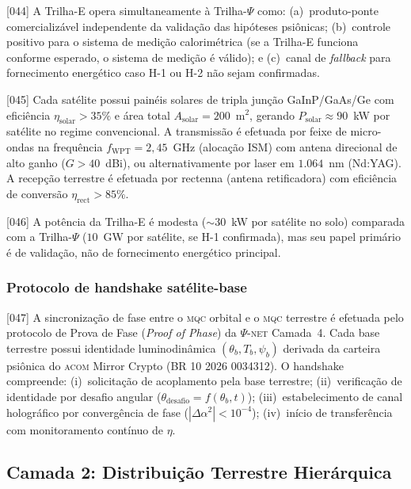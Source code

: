 \documentclass[12pt,a4paper]{article}
\newcommand{\alphaii}{\alpha^2}
\newcommand{\psion}{\psi}
\newcommand{\Psifield}{\Psi}
\newcommand{\ACOM}{\textsc{acom}}
\newcommand{\MQC}{\textsc{mqc}}
\newcommand{\PsiNET}{$\Psifield$-\textsc{net}}
\begin{document}
{[044]} A Trilha-E opera simultaneamente à Trilha-$\Psifield$ como: (a)~produto-ponte comercializável independente da validação das hipóteses psiônicas; (b)~controle positivo para o sistema de medição calorimétrica (se a Trilha-E funciona conforme esperado, o sistema de medição é válido); e (c)~canal de \textit{fallback} para fornecimento energético caso H-1 ou H-2 não sejam confirmadas.

{[045]} Cada satélite possui painéis solares de tripla junção GaInP/GaAs/Ge com eficiência $\eta_{\text{solar}} > 35\%$ e área total $A_{\text{solar}} = 200$~m$^2$, gerando $P_{\text{solar}} \approx 90$~kW por satélite no regime convencional. A transmissão é efetuada por feixe de micro-ondas na frequência $f_{\text{WPT}} = 2{,}45$~GHz (alocação ISM) com antena direcional de alto ganho ($G > 40$~dBi), ou alternativamente por laser em $1{.}064$~nm (Nd:YAG). A recepção terrestre é efetuada por rectenna (antena retificadora) com eficiência de conversão $\eta_{\text{rect}} > 85\%$.

{[046]} A potência da Trilha-E é modesta ($\sim 30$~kW por satélite no solo) comparada com a Trilha-$\Psifield$ ($10$~GW por satélite, se H-1 confirmada), mas seu papel primário é de validação, não de fornecimento energético principal.

\subsubsection{Protocolo de handshake satélite-base}

{[047]} A sincronização de fase entre o \MQC{} orbital e o \MQC{} terrestre é efetuada pelo protocolo de Prova de Fase (\textit{Proof of Phase}) da \PsiNET{} Camada~4. Cada base terrestre possui identidade luminodinâmica $(\theta_b, T_b, \psion_b)$ derivada da carteira psiônica do \ACOM{} Mirror Crypto (BR 10 2026 0034312). O handshake compreende: (i)~solicitação de acoplamento pela base terrestre; (ii)~verificação de identidade por desafio angular ($\theta_{\text{desafio}} = f(\theta_b, t)$); (iii)~estabelecimento de canal holográfico por convergência de fase ($|\Delta\alphaii| < 10^{-4}$); (iv)~início de transferência com monitoramento contínuo de $\eta$.

\subsection{Camada 2: Distribuição Terrestre Hierárquica}
\label{sec:camada2}
\end{document}
